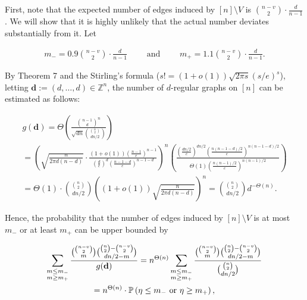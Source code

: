 \documentclass[10pt,a4paper]{article}
\begin{document}
First, note that the expected number of edges induced by $[n]\setminus V$ is $\binom{n-v}{2}\cdot\frac{d}{n-1}$. We will show that it is highly unlikely that the actual number deviates substantially from it. Let\par


\[\begin{gathered}
m_{-}=0.9\binom{n-v}{2}\cdot\frac{d}{n-1}\qquad\text{ and }\qquad m_{+}=1.1\binom{n-v}{2}\cdot\frac{d}{n-1}.
\end{gathered}\]


By Theorem 7 and the Stirling’s formula ($s!=(1+o(1))\sqrt{2\pi s}(s/e)^{s}$), letting $\mathbf{d}:=(d,\ldots,d)\in\mathbb{Z}^{n}$, the number of $d$-regular graphs on $[n]$ can be estimated as follows:\par


\[\begin{gathered}
\displaystyle g(\mathbf{d}) \displaystyle=\Theta\left(\frac{{n-1\choose d}^{n}}{\sqrt{dn}{{\binom{n}{2}}\choose dn/2}}\right) \\
\displaystyle=\left(\!\sqrt{\frac{n}{2\pi d(n-d)}}\cdot\frac{(1+o(1))\left(\frac{n-1}{e}\right)^{n-1}}{\left(\frac{d}{e}\right)^{d}\left(\frac{n-1-d}{e}\right)^{n-1-d}}\right)^{n}\!\left(\!\frac{\left(\frac{dn/2}{e}\right)^{dn/2}\left(\frac{n(n-1-d)/2}{e}\right)^{n(n-1-d)/2}}{\Theta(1)\left(\frac{n(n-1)/2}{e}\right)^{n(n-1)/2}}\right) \\
\displaystyle=\Theta(1)\cdot{{\binom{n}{2}}\choose dn/2}\left(\!(1+o(1))\sqrt{\frac{n}{2\pi d(n-d)}}\right)^{n}={{\binom{n}{2}}\choose dn/2}d^{-\Theta(n)}.
\end{gathered}\]


Hence, the probability that the number of edges induced by $[n]\setminus V$ is at most $m_{-}$ or at least $m_{+}$ can be upper bounded by\par


\[\begin{gathered}
\displaystyle\sum_{\begin{subarray}{c}m\leq m_{-}\\
m\geq m_{+}\end{subarray}}\frac{{{n-v\choose 2}\choose m}{{\binom{n}{2}}-{n-v\choose 2}\choose dn/2-m}}{g(\mathbf{d})} \displaystyle=n^{\Theta(n)}\sum_{\begin{subarray}{c}m\leq m_{-}\\
m\geq m_{+}\end{subarray}}\frac{{{n-v\choose 2}\choose m}{{\binom{n}{2}}-{n-v\choose 2}\choose dn/2-m}}{{{\binom{n}{2}}\choose dn/2}} \\
\displaystyle=n^{\Theta(n)}\cdot\mathbb{P}\left(\eta\leq m_{-}\text{ or }\eta\geq m_{+}\right),
\end{gathered}\]
\end{document}
